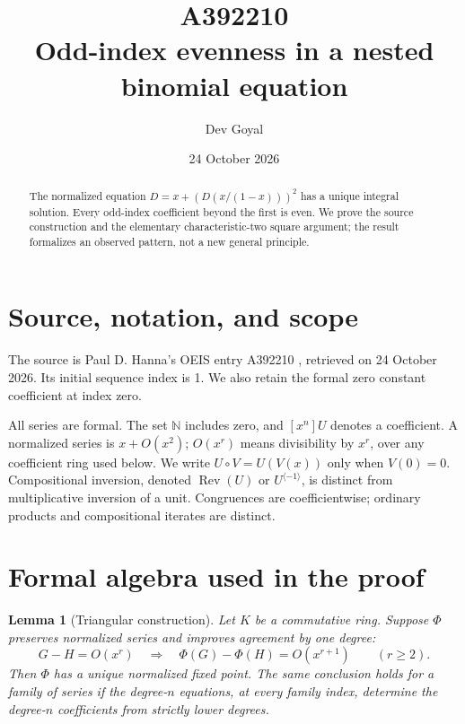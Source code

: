 \documentclass[11pt,a4paper]{article}
\title{A392210\\[4pt]\large Odd-index evenness in a nested binomial equation}
\author{Dev Goyal}
\date{24 October 2026}
\newtheorem{lemma}[theorem]{Lemma}
\theoremstyle{remark}
\newcommand{\N}{\mathbb N}
\newcommand{\Rev}{\operatorname{Rev}}
\newcommand{\rev}{^{\langle-1\rangle}}
\begin{document}
\maketitle
\begin{center}
\end{center}
\begin{abstract}
The normalized equation $D=x+(D(x/(1-x)))^2$ has a unique integral solution. Every odd-index coefficient beyond the first is even. We prove the source construction and the elementary characteristic-two square argument; the result formalizes an observed pattern, not a new general principle.
\end{abstract}

\section{Source, notation, and scope}

The source is Paul D. Hanna's OEIS entry A392210 \cite{oeis210},
retrieved on 24 October 2026. Its initial sequence index is 1.
We also retain the formal zero constant coefficient at index zero.

All series are formal. The set $\N$ includes zero, and $[x^n]U$ denotes a
coefficient. A normalized series is $x+O(x^2)$; $O(x^r)$ means divisibility
by $x^r$, over any coefficient ring used below. We write $U\circ V=U(V(x))$
only when $V(0)=0$. Compositional inversion, denoted $\Rev(U)$ or $U\rev$,
is distinct from multiplicative inversion of a unit. Congruences are
coefficientwise; ordinary products and compositional iterates are distinct.

\section{Formal algebra used in the proof}

\begin{lemma}[Triangular construction]\label{lem:construction}
Let $K$ be a commutative ring. Suppose $\Phi$ preserves normalized series
and improves agreement by one degree:
\[
 G-H=O(x^r)\quad\Longrightarrow\quad
 \Phi(G)-\Phi(H)=O(x^{r+1})\qquad(r\ge2).
\]
Then $\Phi$ has a unique normalized fixed point. The same conclusion holds
for a family of series if the degree-$n$ equations, at every family index,
determine the degree-$n$ coefficients from strictly lower degrees.
\end{lemma}
\end{document}
